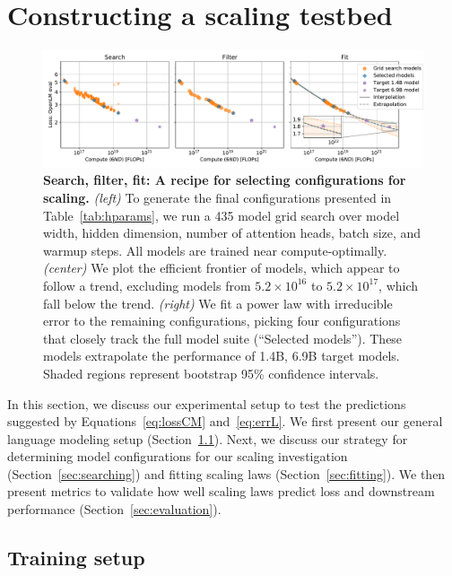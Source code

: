 \section{Constructing a scaling testbed}
\label{sec:experiments}

\begin{figure}[tp]
    \centering
    \includegraphics[width=\linewidth]{figs/grid_full.pdf}
    \caption{\textbf{Search, filter, fit:
    A recipe for selecting configurations for scaling.}
    \emph{(left)} To generate the final configurations presented in Table~\ref{tab:hparams}, we run a 435 model grid search over model width, hidden dimension, number of attention heads, batch size, and warmup steps.
    All models are trained near compute-optimally.
    \emph{(center)} We plot the efficient frontier of models, which appear to follow a trend, excluding models from $5.2 \times 10^{16}$ to $5.2 \times 10^{17}$, which fall below the trend.
    \emph{(right)} We fit a power law with irreducible error to the remaining configurations, picking four configurations that closely track the full model suite (``Selected models'').
    These models extrapolate the performance of 1.4B, 6.9B target models.
    Shaded regions represent bootstrap 95\% confidence intervals.
    }
    \label{fig:grid}
\end{figure}

In this section, we discuss our experimental setup to test the predictions suggested by Equations~\eqref{eq:lossCM} and~\eqref{eq:errL}.
We first present our general language modeling setup (Section~\ref{sec:training}).
Next, we discuss our strategy for determining model configurations for our scaling investigation (Section~\ref{sec:searching}) and fitting scaling laws (Section~\ref{sec:fitting}).
We then present metrics to validate how well scaling laws predict loss and downstream performance (Section~\ref{sec:evaluation}).

\subsection{Training setup}
\label{sec:training}

